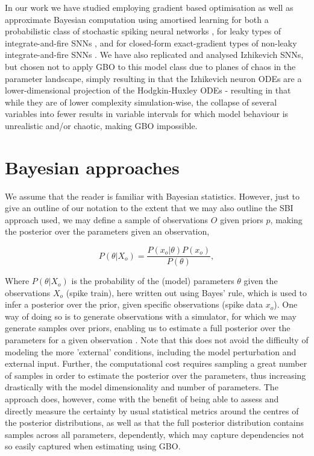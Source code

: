 \documentclass[mphil,deptreport,ianc]{infthesis} %
\begin{document}
In our work we have studied employing gradient based optimisation as well as approximate Bayesian computation using amortised learning for both a probabilistic class of stochastic spiking neural networks \cite{Rene2020}, for leaky types of integrate-and-fire SNNs \cite{allen_glif_white_paper}, and for closed-form exact-gradient types of non-leaky integrate-and-fire SNNs \cite{Huh2017}.
We have also replicated and analysed Izhikevich SNNs, but chosen not to apply GBO to this model class due to planes of chaos in the parameter landscape, simply resulting in that the Izhikevich neuron ODEs are a lower-dimensional projection of the Hodgkin-Huxley ODEs - resulting in that while they are of lower complexity simulation-wise, the collapse of several variables into fewer results in variable intervals for which model behaviour is unrealistic and/or chaotic, making GBO impossible.


\section{Bayesian approaches}

We assume that the reader is familiar with Bayesian statistics. However, just to give an outline of our notation to the extent that we may also outline the SBI approach used, we may define a sample of observations $O$ given priors $p$, making the posterior over the parameters given an observation,

\begin{equation}
    P(\theta|X_o) = \frac{P(x_o|\theta)P(x_o)}{P(\theta)},
\end{equation}

Where $P(\theta|X_o)$ is the probability of the (model) parameters $\theta$ given the observations $X_o$ (spike train), here written out using Bayes' rule, which is used to infer a posterior over the prior, given specific observations (spike data $x_o$).
One way of doing so is to generate observations with a simulator, for which we may generate samples over priors, enabling us to estimate a full posterior over the parameters for a given observation \cite{Lueckmann2017, Lueckmann2018}.
Note that this does not avoid the difficulty of modeling the more 'external' conditions, including the model perturbation and external input.
Further, the computational cost requires sampling a great number of samples in order to estimate the posterior over the parameters, thus increasing drastically with the model dimensionality and number of parameters.
The approach does, however, come with the benefit of being able to assess and directly measure the certainty by usual statistical metrics around the centres of the posterior distributions, as well as that the full posterior distribution contains samples across all parameters, dependently, which may capture dependencies not so easily captured when estimating using GBO.
\end{document}
